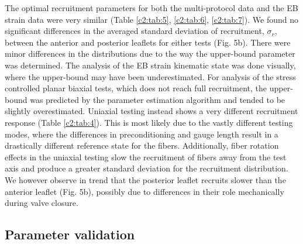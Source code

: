     
    The optimal recruitment parameters for both the multi-protocol data and the EB strain data were very similar (Table \ref{c2:tab:5}, \ref{c2:tab:6}, \ref{c2:tab:7}). We found no significant differences in the averaged standard deviation of recruitment, $\sigma_r$, between the anterior and posterior leaflets for either tests (Fig. 5b). There were minor differences in the distributions due to the way the upper-bound parameter was determined. The analysis of the EB strain kinematic state was done visually, where the upper-bound may have been underestimated. For analysis of the stress controlled planar biaxial tests, which does not reach full recruitment, the upper-bound was predicted by the parameter estimation algorithm and tended to be slightly overestimated. Uniaxial testing instead shows a very different recruitment response (Table \ref{c2:tab:4}). This is most likely due to the vastly different testing modes, where the differences in preconditioning and gauge length result in a drastically different reference state for the fibers. Additionally, fiber rotation effects in the uniaxial testing slow the recruitment of fibers away from the test axis and produce a greater standard deviation for the recruitment distribution. We however observe in trend that the posterior leaflet recruits slower than the anterior leaflet (Fig. 5b), possibly due to differences in their role mechanically during valve closure.
    
    


\subsection{Parameter validation} \label{c2:sec:233}

